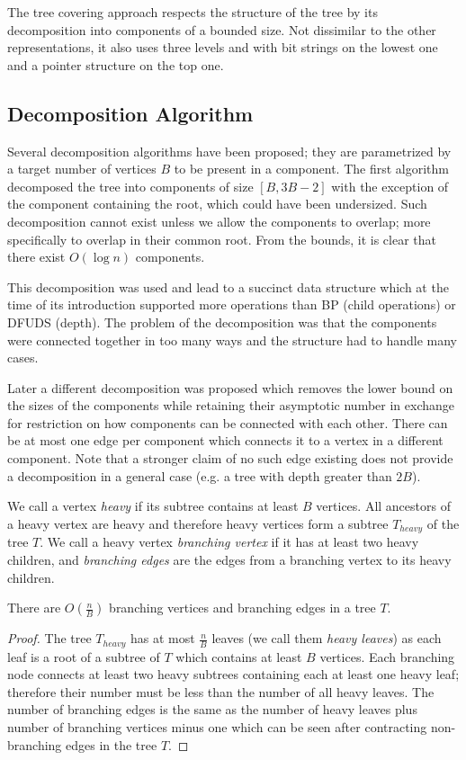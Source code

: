 The tree covering approach respects the structure of the tree by its decomposition into components of a bounded size.
Not dissimilar to the other representations, it also uses three levels and with bit strings on the lowest one and a pointer structure on the top one.

\subsection{Decomposition Algorithm}

Several decomposition algorithms have been proposed; they are parametrized by a target number of vertices $B$ to be present in a component.
The first algorithm  decomposed the tree into components of size $[B, 3 B - 2]$ with the exception of the component containing the root, which could have been undersized.
Such decomposition cannot exist unless we allow the components to overlap; more specifically to overlap in their common root.
From the bounds, it is clear that there exist $O(\log n)$ components.

This decomposition was used and lead to a succinct data structure which at the time of its introduction supported more operations than BP (child operations) or DFUDS (depth).
The problem of the decomposition was that the components were connected together in too many ways and the structure had to handle many cases.

Later a different decomposition was proposed which removes the lower bound on the sizes of the components while retaining their asymptotic number in exchange for restriction on how components can be connected with each other.
There can be at most one edge per component which connects it to a vertex in a different component.
Note that a stronger claim of no such edge existing does not provide a decomposition in a general case (e.g. a tree with depth greater than $2 B$).

We call a vertex \emph{heavy} if its subtree contains at least $B$ vertices.
All ancestors of a heavy vertex are heavy and therefore heavy vertices form a subtree $T_{heavy}$ of the tree $T$.
We call a heavy vertex \emph{branching vertex} if it has at least two heavy children, and \emph{branching edges} are the edges from a branching vertex to its heavy children.

\begin{lemma}
	There are $O\left(\frac{n}{B}\right)$ branching vertices and branching edges in a tree $T$.
\end{lemma}
\begin{proof}
	The tree $T_{heavy}$ has at most $\frac{n}{B}$ leaves (we call them \emph{heavy leaves}) as each leaf is a root of a subtree of $T$ which contains at least $B$ vertices.
	Each branching node connects at least two heavy subtrees containing each at least one heavy leaf; therefore their number must be less than the number of all heavy leaves.
	The number of branching edges is the same as the number of heavy leaves plus number of branching vertices minus one which can be seen after contracting non-branching edges in the tree $T$.
\end{proof}

